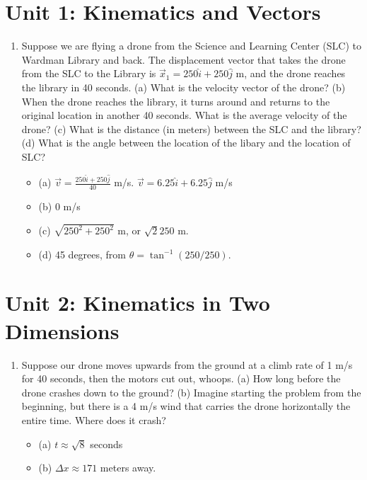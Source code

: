 \documentclass[10pt]{article}
\begin{document}
\section{Unit 1: Kinematics and Vectors}
\begin{enumerate}
\item Suppose we are flying a drone from the Science and Learning Center (SLC) to Wardman Library and back.  The displacement vector that takes the drone from the SLC to the Library is $\vec{x}_1 = 250 \hat{i} + 250 \hat{j}$ m, and the drone reaches the library in 40 seconds.  (a) What is the velocity vector of the drone? (b) When the drone reaches the library, it turns around and returns to the original location in another 40 seconds.  What is the average velocity of the drone? (c) What is the distance (in meters) between the SLC and the library?  (d) What is the angle between the location of the libary and the location of SLC?
\begin{itemize}
\item (a) $\vec{v} = \frac{250\hat{i} + 250\hat{j}}{40}$ m/s.  $\vec{v} = 6.25\hat{i}+6.25\hat{j}$ m/s
\item (b) 0 m/s
\item (c) $\sqrt{250^2 + 250^2}$ m, or $\sqrt{2} 250$ m.
\item (d) 45 degrees, from $\theta = \tan^{-1}(250/250)$.
\end{itemize}
\end{enumerate}

\section{Unit 2: Kinematics in Two Dimensions}
\begin{enumerate}
\item Suppose our drone moves upwards from the ground at a climb rate of 1 m/s for 40 seconds, then the motors cut out, whoops.  (a) How long before the drone crashes down to the ground?  (b) Imagine starting the problem from the beginning, but there is a 4 m/s wind that carries the drone horizontally the entire time.  Where does it crash?
\begin{itemize}
\item (a) $t \approx \sqrt{8}$ seconds
\item (b) $\Delta x \approx 171$ meters away.
\end{itemize}
\end{enumerate}
\end{document}
